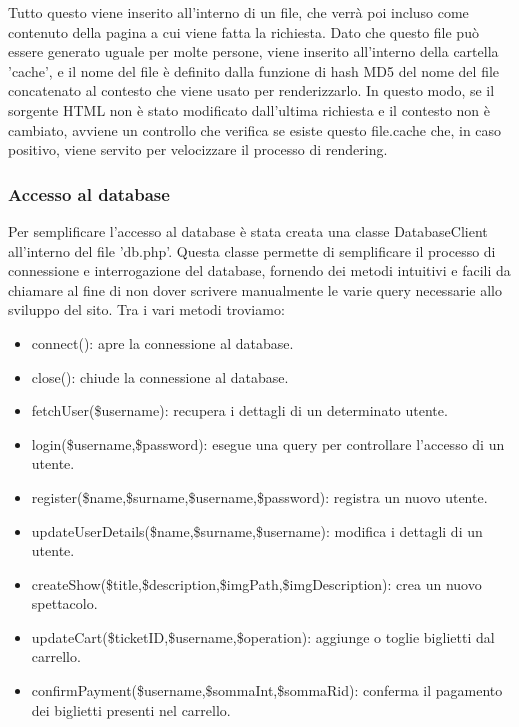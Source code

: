 Tutto questo viene inserito all'interno di un file, che verrà poi incluso come contenuto della pagina a cui viene fatta la richiesta. Dato che questo file può essere generato uguale per molte persone, viene inserito all'interno della cartella 'cache', e il nome del file è definito dalla funzione di hash MD5 del nome del file concatenato al contesto che viene usato per renderizzarlo. In questo modo, se il sorgente HTML non è stato modificato dall'ultima richiesta e il contesto non è cambiato, avviene un controllo che verifica se esiste questo file.cache che, in caso positivo, viene servito per velocizzare il processo di rendering.

\subsubsection{Accesso al database}
Per semplificare l'accesso al database è stata creata una classe DatabaseClient all'interno del file 'db.php'. Questa classe permette di semplificare il processo di connessione e interrogazione del database, fornendo dei metodi intuitivi e facili da chiamare al fine di non dover scrivere manualmente le varie query necessarie allo sviluppo del sito.
Tra i vari metodi troviamo:
\begin{itemize}
    \item connect(): apre la connessione al database.
    \item close(): chiude la connessione al database.
    \item fetchUser(\$username): recupera i dettagli di un determinato utente.
    \item login(\$username,\$password): esegue una query per controllare l'accesso di un utente.
    \item register(\$name,\$surname,\$username,\$password): registra un nuovo utente.
    \item updateUserDetails(\$name,\$surname,\$username): modifica i dettagli di un utente.
    \item createShow(\$title,\$description,\$imgPath,\$imgDescription): crea un nuovo spettacolo.
    \item updateCart(\$ticketID,\$username,\$operation): aggiunge o toglie biglietti dal carrello.
    \item confirmPayment(\$username,\$sommaInt,\$sommaRid): conferma il pagamento dei biglietti presenti nel carrello.
\end{itemize}
